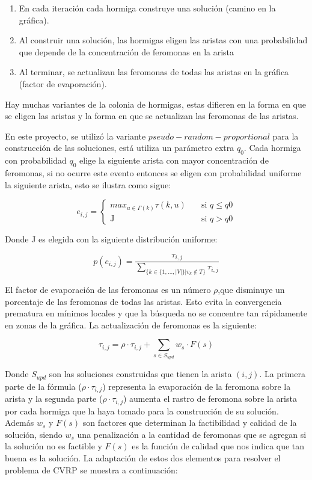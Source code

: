 \documentclass[12pt]{article}
\begin{document}
	\begin{enumerate}
		\item En cada iteración cada hormiga construye una solución (camino en la
		gráfica).
		\item Al construir una solución, las hormigas eligen las aristas con una
		probabilidad que depende de la concentración de feromonas en la arista
		\item Al terminar, se actualizan las feromonas de todas las aristas en la 
		gráfica (factor de evaporación).
	\end{enumerate}
	
	Hay muchas variantes de la colonia de hormigas, estas difieren en la forma en que
	se eligen las aristas y la forma en que se actualizan las feromonas de las 
	aristas.
	
	En este proyecto, se utilizó la variante $pseudo-random-proportional$ para la
	construcción de las soluciones, está utiliza un parámetro extra $q_0$. Cada
	hormiga con probabilidad $q_0$ elige la siguiente arista con mayor concentración 
	de feromonas, si no ocurre este evento entonces se eligen con probabilidad 
	uniforme la siguiente arista, esto se ilustra como sigue:
	
	\[e_{i,j}=
	\begin{cases}
		max_{u\in \Gamma(k)}\tau(k,u)&\quad\text{si $q \leq q0$}\\
		\text{J}&\quad\text{si $q > q0$}
	\end{cases}\]

	Donde J es elegida con la siguiente distribución uniforme:

	\[p(e_{i,j})=\frac{\tau_{i,j}}{\sum_{\{k\in \{1,...,|V|\}|v_k\notin T\}}\tau_{i,j}}\]
		
	El factor de evaporación de las feromonas es un número $\rho$,que disminuye un porcentaje de las feromonas de todas las aristas. Esto evita la convergencia 
	prematura en mínimos locales y que la búsqueda no se concentre tan rápidamente 
	en zonas de la gráfica.
	La actualización de feromonas es la siguiente:
	
	\[\tau_{i,j}=\rho \cdot \tau_{i,j} + \sum_{s\in S_{upd}} w_s \cdot F(s)	\]
	
	Donde $S_{upd}$ son las soluciones construidas que tienen la arista $(i,j)$.
	La primera parte de la fórmula ($\rho \cdot \tau_{i,j} $) representa la 
	evaporación de la feromona sobre la arista y la segunda parte ($\rho \cdot 
	\tau_{i,j} $) aumenta el rastro de feromona sobre la arista por cada hormiga 
	que la haya tomado para la construcción de su solución. Además $w_s$ y $F(s)$ son
	factores que determinan la factibilidad y calidad de la solución, siendo $w_s$
	una penalización a la cantidad de feromonas que se agregan si la solución no 
	es factible y $F(s)$ es la función de calidad que nos indica que tan buena es 
	la solución. La adaptación de estos dos elementos para resolver el problema de 
	CVRP se muestra a continuación:
	
\end{document}
